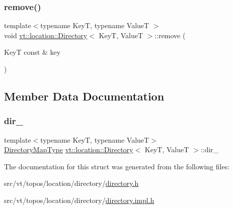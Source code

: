\mbox{\label{structvt_1_1location_1_1_directory_a85c59bd87eecbfabcbd7941e1c1929ae}} 
\subsubsection{\texorpdfstring{remove()}{remove()}}
{\footnotesize\ttfamily template$<$typename KeyT, typename ValueT $>$ \\
void \hyperlink{structvt_1_1location_1_1_directory}{vt\+::location\+::\+Directory}$<$ KeyT, ValueT $>$\+::remove (\begin{DoxyParamCaption}\item[{KeyT const \&}]{key }\end{DoxyParamCaption})}



\subsection{Member Data Documentation}
\mbox{\label{structvt_1_1location_1_1_directory_a8febd5f13d21274bce41021ba2a3da03}} 
\subsubsection{\texorpdfstring{dir\+\_\+}{dir\_}}
{\footnotesize\ttfamily template$<$typename KeyT, typename ValueT$>$ \\
\hyperlink{structvt_1_1location_1_1_directory_a6a897ff3929eccb2d334eb0b87b53f57}{Directory\+Map\+Type} \hyperlink{structvt_1_1location_1_1_directory}{vt\+::location\+::\+Directory}$<$ KeyT, ValueT $>$\+::dir\+\_\+\hspace{0.3cm}{\ttfamily [private]}}



The documentation for this struct was generated from the following files\+:\begin{DoxyCompactItemize}
\item 
src/vt/topos/location/directory/\hyperlink{directory_8h}{directory.\+h}\item 
src/vt/topos/location/directory/\hyperlink{directory_8impl_8h}{directory.\+impl.\+h}\end{DoxyCompactItemize}
